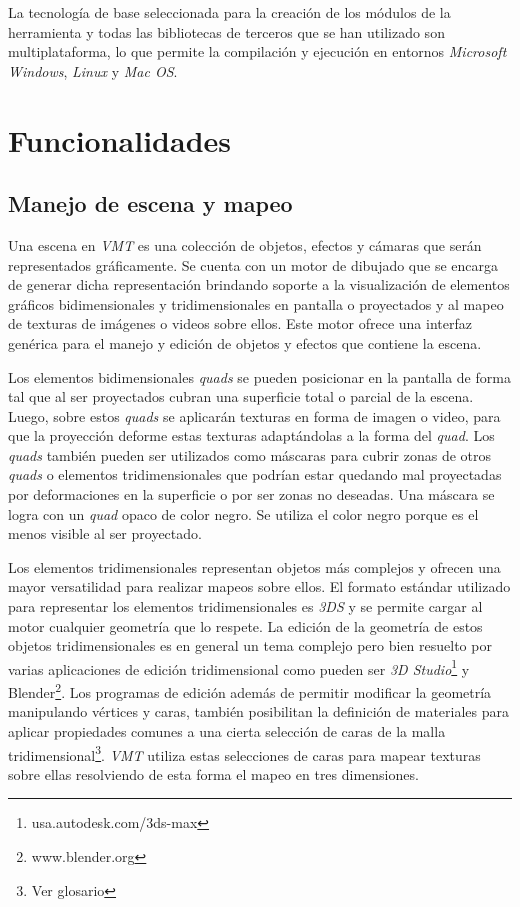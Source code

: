 La tecnología de base seleccionada para la creación de los módulos de la herramienta y todas las bibliotecas de terceros que se han utilizado son multiplataforma, lo que permite la compilación y ejecución en entornos \emph{Microsoft Windows}, \emph{Linux} y \emph{Mac OS}.

\section{Funcionalidades}

\subsection{Manejo de escena y mapeo}

Una escena en \emph{VMT} es una colección de objetos, efectos y cámaras que serán representados gráficamente. Se cuenta con un motor de dibujado que se encarga de generar dicha representación brindando soporte a la visualización de elementos gráficos bidimensionales y tridimensionales en pantalla o proyectados y al mapeo de texturas de imágenes o videos sobre ellos. Este motor ofrece una interfaz genérica para el manejo y edición de objetos y efectos que contiene la escena.

Los elementos bidimensionales \emph{quads} se pueden posicionar en la pantalla de forma tal que al ser proyectados cubran una superficie total o parcial de la escena. Luego, sobre estos \emph{quads} se aplicarán texturas en forma de imagen o video, para que la proyección deforme estas texturas adaptándolas a la forma del \emph{quad}.
Los \emph{quads} también pueden ser utilizados como máscaras para cubrir zonas de otros \emph{quads} o elementos tridimensionales que podrían estar quedando mal proyectadas por deformaciones en la superficie o por ser zonas no deseadas. Una máscara se logra con un \emph{quad} opaco de color negro. Se utiliza el color negro porque es el menos visible al ser proyectado.

Los elementos tridimensionales representan objetos más complejos y ofrecen una mayor versatilidad para realizar mapeos sobre ellos.
El formato estándar utilizado para representar los elementos tridimensionales es \emph{3DS}\cite{3DS} y se permite cargar al motor cualquier geometría que lo respete.
La edición de la geometría de estos objetos tridimensionales es en general un tema complejo pero bien resuelto por varias aplicaciones de edición tridimensional como pueden ser \emph{3D Studio}\footnote{usa.autodesk.com/3ds-max} y Blender\footnote{www.blender.org}. %
Los programas de edición además de permitir modificar la geometría manipulando vértices y caras, también posibilitan la definición de materiales para aplicar propiedades comunes a una cierta selección de caras de la malla tridimensional\footnote{Ver glosario}. \emph{VMT} utiliza estas selecciones de caras para mapear texturas sobre ellas resolviendo de esta forma el mapeo en tres dimensiones.

